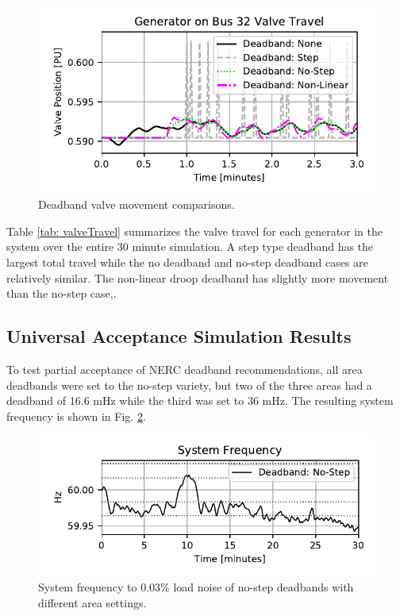 \begin{figure}[!ht]
\centering
\includegraphics[width=\linewidth]{figures/gen32ValveComp}
\caption{Deadband valve movement comparisons.}
\label{fig: valveComp}
\end{figure}

Table \ref{tab: valveTravel} summarizes the valve travel for each generator in the system over the entire 30 minute simulation. A step type deadband has the largest total travel while the no deadband and no-step deadband cases are relatively similar.
The non-linear droop deadband has slightly more movement than the no-step case,.




\subsection{Universal Acceptance Simulation Results}
To test partial acceptance of NERC deadband recommendations, all area deadbands were set to the no-step variety, but two of the three areas had a deadband of 16.6 mHz while the third was set to 36 mHz.
The resulting system frequency is shown in Fig. \ref{fig: uniFreq}.

\begin{figure}[!ht]
\centering
\includegraphics[width=\linewidth]{figures/miniWECCuniAccFreq}
\caption{System frequency to 0.03\% load noise of no-step deadbands with different area settings.}
\label{fig: uniFreq}
\end{figure}


